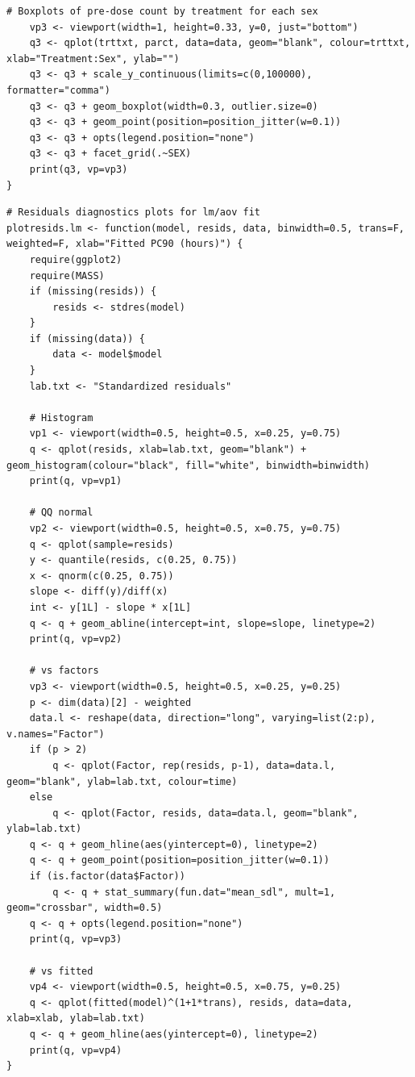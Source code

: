 \begin{singlespace}
\begin{lstlisting}[caption=Boxplots of pre-dose count by sex\, centre and treatment,label=R:predoseaov]
	# Boxplots of pre-dose count by treatment for each sex
	vp3 <- viewport(width=1, height=0.33, y=0, just="bottom")
	q3 <- qplot(trttxt, parct, data=data, geom="blank", colour=trttxt, xlab="Treatment:Sex", ylab="")
	q3 <- q3 + scale_y_continuous(limits=c(0,100000), formatter="comma")
	q3 <- q3 + geom_boxplot(width=0.3, outlier.size=0)
	q3 <- q3 + geom_point(position=position_jitter(w=0.1))
	q3 <- q3 + opts(legend.position="none")
	q3 <- q3 + facet_grid(.~SEX)
	print(q3, vp=vp3)
}
\end{lstlisting}

\begin{lstlisting}[caption=Residuals diagnostic plots for \texttt{lm,aov} fitted models,label=R:plotresids.lm]
# Residuals diagnostics plots for lm/aov fit
plotresids.lm <- function(model, resids, data, binwidth=0.5, trans=F, weighted=F, xlab="Fitted PC90 (hours)") {
	require(ggplot2)
	require(MASS)
	if (missing(resids)) {
		resids <- stdres(model)
	}
	if (missing(data)) {
		data <- model$model
	}
	lab.txt <- "Standardized residuals"

	# Histogram
	vp1 <- viewport(width=0.5, height=0.5, x=0.25, y=0.75)
	q <- qplot(resids, xlab=lab.txt, geom="blank") + geom_histogram(colour="black", fill="white", binwidth=binwidth) 
	print(q, vp=vp1)

	# QQ normal
	vp2 <- viewport(width=0.5, height=0.5, x=0.75, y=0.75)
	q <- qplot(sample=resids)
	y <- quantile(resids, c(0.25, 0.75))
	x <- qnorm(c(0.25, 0.75))
	slope <- diff(y)/diff(x)
	int <- y[1L] - slope * x[1L]
	q <- q + geom_abline(intercept=int, slope=slope, linetype=2)
	print(q, vp=vp2)

	# vs factors
	vp3 <- viewport(width=0.5, height=0.5, x=0.25, y=0.25)
	p <- dim(data)[2] - weighted
	data.l <- reshape(data, direction="long", varying=list(2:p), v.names="Factor")
	if (p > 2)
		q <- qplot(Factor, rep(resids, p-1), data=data.l, geom="blank", ylab=lab.txt, colour=time)
	else
		q <- qplot(Factor, resids, data=data.l, geom="blank", ylab=lab.txt)
	q <- q + geom_hline(aes(yintercept=0), linetype=2)
	q <- q + geom_point(position=position_jitter(w=0.1))
	if (is.factor(data$Factor))
		q <- q + stat_summary(fun.dat="mean_sdl", mult=1, geom="crossbar", width=0.5)
	q <- q + opts(legend.position="none")
	print(q, vp=vp3)

	# vs fitted
	vp4 <- viewport(width=0.5, height=0.5, x=0.75, y=0.25)
	q <- qplot(fitted(model)^(1+1*trans), resids, data=data, xlab=xlab, ylab=lab.txt)
	q <- q + geom_hline(aes(yintercept=0), linetype=2)
	print(q, vp=vp4)
}
\end{lstlisting}


\end{singlespace}
